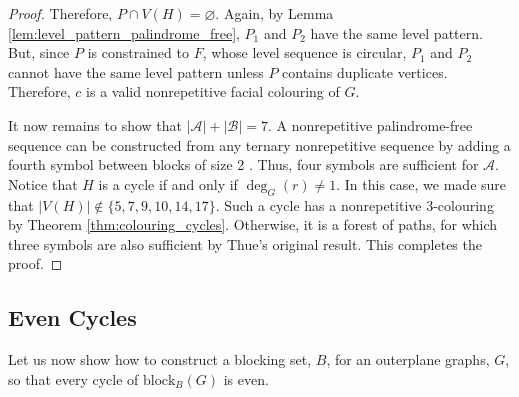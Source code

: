 \documentclass{patmorin}
\let\emptyset\varnothing
\newcommand{\block}{\mathrm{block}}
\begin{document}
\begin{proof}
 Therefore, $P \cap V(H) = \emptyset$. Again, by Lemma \ref{lem:level_pattern_palindrome_free}, $P_1$ and $P_2$ have the same level pattern. But, since $P$ is constrained to $F$, whose level sequence is circular, $P_1$ and $P_2$ cannot have the same level pattern unless $P$ contains duplicate vertices. Therefore, $c$ is a valid nonrepetitive facial colouring of $G$.
 
 It now remains to show that $|\mathcal{A}|+|\mathcal{B}|=7$. A nonrepetitive palindrome-free sequence can be constructed from any ternary nonrepetitive sequence by adding a fourth symbol between blocks of size 2 \cite{brevsar2007nonrepetitive}. Thus, four symbols are sufficient for $\mathcal{A}$. Notice that $H$ is a cycle if and only if $\deg_G(r)\not=1$. In this case, we made sure that $|V(H)| \notin \{5,7,9,10,14,17\}$. Such a cycle has a nonrepetitive 3-colouring by Theorem \ref{thm:colouring_cycles}. Otherwise, it is a forest of paths, for which three symbols are also sufficient by Thue's original result. This completes the proof. 	
\end{proof}


\subsection{Even Cycles}
Let us now show how to construct a blocking set, $B$, for an outerplane graphs, $G$,
so that every cycle of $\block_B(G)$ is even. 

% 
% 
\end{document}
